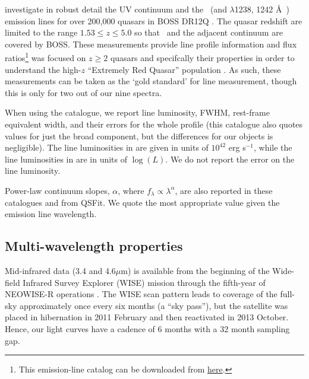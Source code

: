 \documentclass[a4paper,fleqn,usenatbib]{mnras}
\begin{document}
\citet{Hamann2017} investigate in robust detail the UV continuum and
the \civ\ (and \nv $\lambda$1238, 1242 \AA\ ) emission lines for over
200,000 quasars in BOSS DR12Q \citep{Paris2017}.  The quasar redshift
are limited to the range $1.53 \leq z \leq 5.0$ so that \civ\ and the
adjacent continuum are covered by BOSS. These measurements provide
line profile information and flux ratios\footnote{This emission-line
catalog can be downloaded from
\href{https://datadryad.org/stash/dataset/doi:10.6086/D1H59V}{here}.}
\citet{Hamann2017} was focused on $z\geq2$ quasars and specifcally
their \civ properties in order to understand the high-$z$ ``Extremely
Red Quasar'' population \citet{Ross2015, Zakamska2016, Perrotta2019,
Zakamska2019}.  As such, these measurements can be taken as the `gold
standard' for \civ line measurement, though this is only for two out of
our nine spectra.

When using the \citet{Shen2011} catalogue, we report line luminosity,
FWHM, rest-frame equivalent width, and their errors for the whole
\mgii profile (this catalogue also quotes values for just the broad
\mgii component, but the differences for our objects is
negligible). The line luminosities in \citet{Calderone2017} are given
in units of $10^{42}$ erg s$^{-1}$, while the line luminosities in
\citet{Shen2011} are in units of $\log(L)$.  We do not report the
\citet{Shen2011} error on the line luminosity.

Power-law continuum slopes, $\alpha$, where $f_{\lambda} \propto
\lambda^{\alpha}$, are also reported in these catalogues and from
QSFit.  We quote the most appropriate value given the emission line
wavelength.

\subsection{Multi-wavelength properties}
Mid-infrared data (3.4 and 4.6$\mu$m) is available from the beginning of the
Wide-field Infrared Survey Explorer (WISE) mission \citep[2010
January; ][]{Wright2010} through the fifth-year of NEOWISE-R
operations \citep[2018 December; ][]{Mainzer2011}. The WISE scan
pattern leads to coverage of the full-sky approximately once every six
months (a ``sky pass''), but the satellite was placed in hibernation
in 2011 February and then reactivated in 2013 October. Hence, our
light curves have a cadence of 6 months with a 32 month sampling gap.



\end{document}
